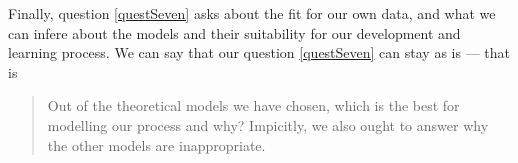 Finally, question \ref{questSeven} asks about the fit for our own data, and what we can
infere about the models and their suitability for our development and learning
process.
We can say that our question \ref{questSeven} can stay as is --- that is
\begin{quote}
  Out of the theoretical models we have chosen, which is the best for modelling
  our process and why?
  Impicitly, we also ought to answer why the other models are inappropriate.
\end{quote} \label{qq7}
